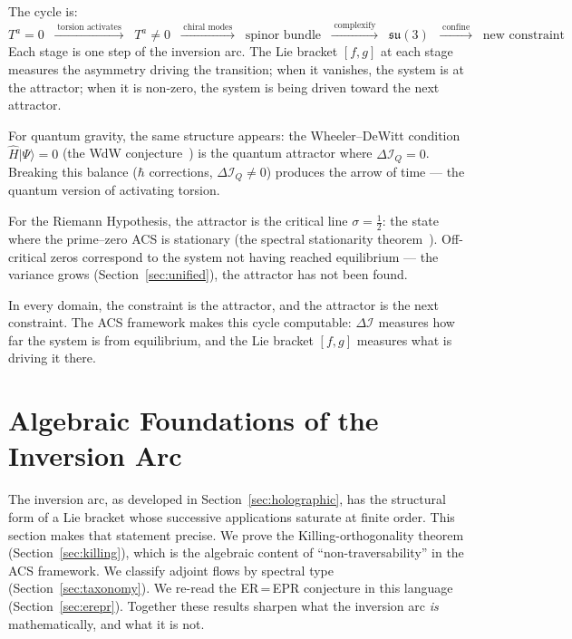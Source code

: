 \documentclass[11pt,a4paper]{article}
\theoremstyle{plain}
\theoremstyle{definition}
\theoremstyle{remark}
\newcommand{\DI}{\Delta\mathcal{I}}
\begin{document}
The cycle is:
\[
  T^a = 0 \;\;\xrightarrow{\;\text{torsion activates}\;}\;\;
  T^a \neq 0 \;\;\xrightarrow{\;\text{chiral modes}\;}\;\;
  \text{spinor bundle} \;\;\xrightarrow{\;\text{complexify}\;}\;\;
  \mathfrak{su}(3) \;\;\xrightarrow{\;\text{confine}\;}\;\;
  \text{new constraint}
\]
Each stage is one step of the inversion arc.
The Lie bracket $[f,g]$ at each stage measures the asymmetry
driving the transition; when it vanishes, the system is at the
attractor; when it is non-zero, the system is being driven
toward the next attractor.

For quantum gravity, the same structure appears:
the Wheeler--DeWitt condition $\hat{H}|\Psi\rangle = 0$
(the WdW conjecture~\cite{Wallace2026a}) is the quantum attractor where
$\DI_Q = 0$.  Breaking this balance ($\hbar$ corrections,
$\DI_Q \neq 0$) produces the arrow of time --- the quantum
version of activating torsion.

For the Riemann Hypothesis, the attractor is the critical line
$\sigma = \tfrac{1}{2}$: the state where the prime--zero ACS is
stationary (the spectral stationarity theorem~\cite{Wallace2026b}).  Off-critical zeros
correspond to the system not having reached equilibrium --- the
variance grows (Section~\ref{sec:unified}), the attractor has
not been found.

In every domain, the constraint is the attractor, and the attractor
is the next constraint.  The ACS framework makes this cycle
computable: $\DI$ measures how far the system is from equilibrium,
and the Lie bracket $[f,g]$ measures what is driving it there.

\section{Algebraic Foundations of the Inversion Arc}
\label{sec:algebraic}

The inversion arc, as developed in Section~\ref{sec:holographic}, has
the structural form of a Lie bracket whose successive applications
saturate at finite order.  This section makes that statement precise.
We prove the Killing-orthogonality theorem (Section~\ref{sec:killing}),
which is the algebraic content of ``non-traversability'' in the ACS
framework.  We classify adjoint flows by spectral type
(Section~\ref{sec:taxonomy}).  We re-read the ER\,=\,EPR conjecture
in this language (Section~\ref{sec:erepr}).  Together these
results sharpen what the inversion arc \emph{is} mathematically,
and what it is not.
\end{document}

